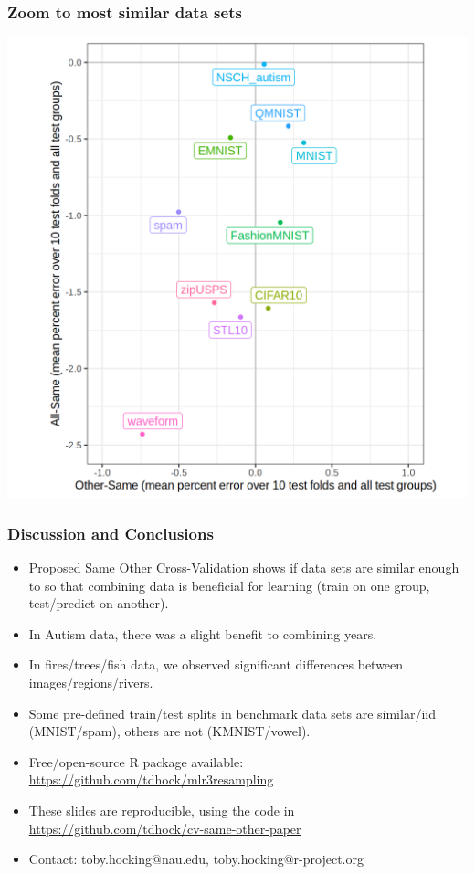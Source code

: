\documentclass{beamer}
\begin{document}
\begin{frame}
  \frametitle{Zoom to most similar data sets}
  \includegraphics[width=0.9\textheight]{data_Classif_batchmark_registry_scatter_other_all_similar.png}
\end{frame}

\begin{frame}
  \frametitle{Discussion and Conclusions}
  \begin{itemize}
  \item Proposed Same Other Cross-Validation shows if
    data sets are similar enough to so that combining data is
    beneficial for learning (train on one group, test/predict on
    another).
  \item In Autism data, there was a slight benefit to combining years.
  \item In fires/trees/fish data, we observed
    significant differences between images/regions/rivers.
  \item Some pre-defined train/test splits in benchmark data sets
    are similar/iid (MNIST/spam), others are not (KMNIST/vowel).
  \item Free/open-source R package available:
    \url{https://github.com/tdhock/mlr3resampling}
  \item These slides are reproducible, using the code in \url{https://github.com/tdhock/cv-same-other-paper}
  \item Contact: toby.hocking@nau.edu,
    toby.hocking@r-project.org
  \end{itemize}
\end{frame}
\end{document}
